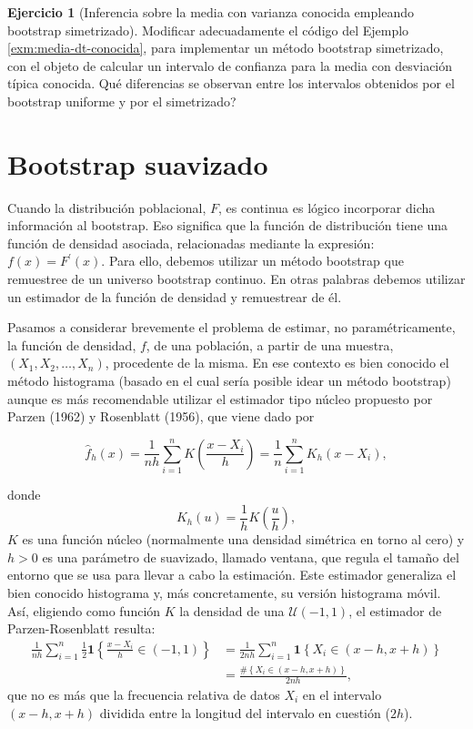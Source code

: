 \documentclass[
]{book}
\theoremstyle{break}
\theoremstyle{definition}
\theoremstyle{definition}
\theoremstyle{definition}
\newtheorem{exercise}{Ejercicio}[chapter]
\theoremstyle{definition}
\theoremstyle{remark}
\begin{document}
\begin{exercise}[Inferencia sobre la media con varianza conocida empleando bootstrap simetrizado]
\protect\hypertarget{exr:media-dt-conocida-sim}{}{\label{exr:media-dt-conocida-sim} \iffalse (Inferencia sobre la media con varianza conocida empleando bootstrap simetrizado) \fi{} }
Modificar adecuadamente el código del Ejemplo \ref{exm:media-dt-conocida}, para
implementar un método bootstrap simetrizado, con el objeto de calcular
un intervalo de confianza para la media con desviación típica conocida.
Qué diferencias se observan entre los intervalos obtenidos por el
bootstrap uniforme y por el simetrizado?
\end{exercise}

\hypertarget{modunif-boot-suav}{%
\section{Bootstrap suavizado}\label{modunif-boot-suav}}

Cuando la distribución poblacional, \(F\), es continua es lógico
incorporar dicha información al bootstrap. Eso significa que la función
de distribución tiene una función de densidad asociada, relacionadas
mediante la expresión: \(f\left( x \right) =F^{\prime}\left( x \right)\). Para ello, debemos utilizar un método bootstrap que
remuestree de un universo bootstrap continuo. En otras palabras debemos
utilizar un estimador de la función de densidad y remuestrear de él.

Pasamos a considerar brevemente el problema de estimar, no
paramétricamente, la función de densidad, \(f\), de una población, a
partir de una muestra, \(\left( X_1,X_2,\ldots ,X_n \right)\),
procedente de la misma. En ese contexto es bien conocido el método
histograma (basado en el cual sería posible idear un método bootstrap)
aunque es más recomendable utilizar el estimador tipo núcleo propuesto
por Parzen (1962) y Rosenblatt (1956), que viene dado por

\[\hat{f}_{h}\left( x \right) =\frac{1}{nh}\sum_{i=1}^{n}K\left( \frac{x-X_i}{
h} \right) =\frac{1}{n}\sum_{i=1}^{n}K_{h}\left( x-X_i \right),\]

donde
\[K_{h}\left( u \right) =\frac{1}{h}K\left( \frac{u}{h} \right),\]
\(K\) es una función núcleo (normalmente una densidad simétrica en torno
al cero) y \(h>0\) es una parámetro de suavizado, llamado ventana, que
regula el tamaño del entorno que se usa para llevar a cabo la
estimación. Este estimador generaliza el bien conocido histograma y, más
concretamente, su versión histograma móvil. Así, eligiendo como función
\(K\) la densidad de una \(\mathcal{U}\left( -1,1 \right)\), el estimador de
Parzen-Rosenblatt resulta:
\[\begin{aligned}
\frac{1}{nh}\sum_{i=1}^{n}\frac{1}{2}\mathbf{1}\left\{ \frac{x-X_i}{h}\in
\left( -1,1 \right) \right\} &= \frac{1}{2nh}\sum_{i=1}^{n}\mathbf{1}\left\{
X_i\in \left( x-h,x+h \right) \right\} \\
&= \frac{\#\left\{ X_i\in \left( x-h,x+h \right) \right\} }{2nh},
\end{aligned}\]
que no es más que la frecuencia relativa de datos \(X_i\) en el
intervalo \(\left( x-h,x+h \right)\) dividida entre la longitud del
intervalo en cuestión (\(2h\)).
\end{document}
